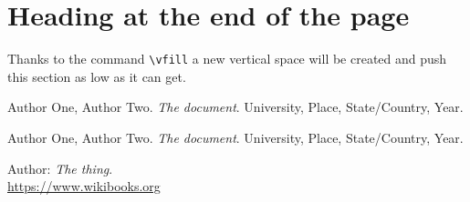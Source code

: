 \documentclass{article}				%
\begin{document}
\vfill

\section{Heading at the end of the page}

Thanks to the command \verb|\vfill| a new vertical space will be created and push this section as low as it can get.

\newpage

\begin{thebibliography}{3} %
	
	Author One, Author Two.
	\textit{The document}. 
	University, Place, State/Country, Year.
	
	Author One, Author Two.
	\textit{The document}. 
	University, Place, State/Country, Year.
	
	Author: \textit{The thing}. 
	\\\url{https://www.wikibooks.org}
	
\end{thebibliography}

\end{document}
